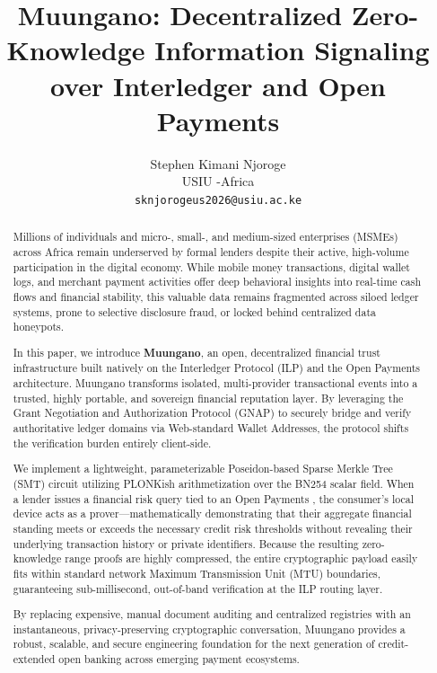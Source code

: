 \documentclass[12pt]{article}
\title{\textbf{Muungano: Decentralized Zero-Knowledge Information Signaling over Interledger and Open Payments}}
\author{
  Stephen Kimani Njoroge \\
  \small{USIU -Africa} \\
  \texttt{sknjorogeus2026@usiu.ac.ke}
}
\date{}
\begin{document}
\maketitle

\begin{abstract}
Millions of individuals and micro-, small-, and medium-sized enterprises (MSMEs) across Africa remain underserved by formal lenders despite their active, high-volume participation in the digital economy. While mobile money transactions, digital wallet logs, and merchant payment activities offer deep behavioral insights into real-time cash flows and financial stability, this valuable data remains fragmented across siloed ledger systems, prone to selective disclosure fraud, or locked behind centralized data honeypots.

In this paper, we introduce \textbf{Muungano}, an open, decentralized financial trust infrastructure built natively on the Interledger Protocol (ILP) and the Open Payments architecture. Muungano transforms isolated, multi-provider transactional events into a trusted, highly portable, and sovereign financial reputation layer. By leveraging the Grant Negotiation and Authorization Protocol (GNAP) to securely bridge and verify authoritative ledger domains via Web-standard Wallet Addresses, the protocol shifts the verification burden entirely client-side.

We implement a lightweight, parameterizable Poseidon-based Sparse Merkle Tree (SMT) circuit utilizing PLONKish arithmetization over the BN254 scalar field. When a lender issues a financial risk query tied to an Open Payments , the consumer's local device acts as a prover---mathematically demonstrating that their aggregate financial standing meets or exceeds the necessary credit risk thresholds without revealing their underlying transaction history or private identifiers. Because the resulting zero-knowledge range proofs are highly compressed, the entire cryptographic payload easily fits within standard network Maximum Transmission Unit (MTU) boundaries, guaranteeing sub-millisecond, out-of-band verification at the ILP routing layer.

By replacing expensive, manual document auditing and centralized registries with an instantaneous, privacy-preserving cryptographic conversation, Muungano provides a robust, scalable, and secure engineering foundation for the next generation of credit-extended open banking across emerging payment ecosystems.
\end{abstract}
\end{document}
